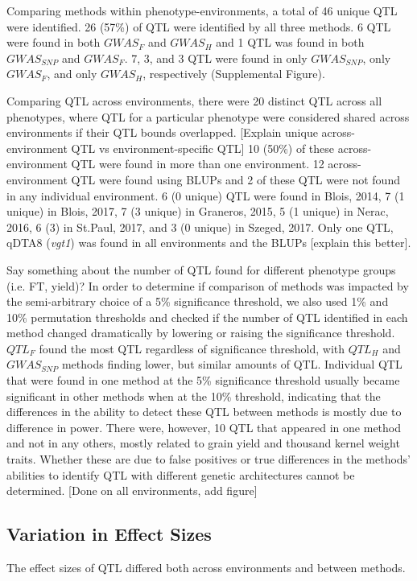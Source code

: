 \documentclass[article,9pt,twocolumn,twoside]{rilabRxiv}
\begin{document}
Comparing methods within phenotype-environments, a total of 46 unique QTL were identified.
26 (57\%) of QTL were identified by all three methods.
6 QTL were found in both $GWAS_F$ and $GWAS_H$ and 1 QTL was found in both $GWAS_{SNP}$ and $GWAS_F$.
7, 3, and 3 QTL were found in only $GWAS_{SNP}$, only $GWAS_F$, and only $GWAS_H$, respectively (Supplemental Figure).

Comparing QTL across environments, there were 20 distinct QTL across all phenotypes, where QTL for a particular phenotype were considered shared across environments if their QTL bounds overlapped.
[Explain unique across-environment QTL vs environment-specific QTL]
10 (50\%) of these across-environment QTL were found in more than one environment.
12 across-environment QTL were found using BLUPs and 2 of these QTL were not found in any individual environment.
6 (0 unique) QTL were found in Blois, 2014, 7 (1 unique) in Blois, 2017, 7 (3 unique) in Graneros, 2015, 5 (1 unique) in Nerac, 2016, 6 (3) in St.Paul, 2017, and 3 (0 unique) in Szeged, 2017.
Only one QTL, qDTA8 (\emph{vgt1}) was found in all environments and the BLUPs [explain this better].

Say something about the number of QTL found for different phenotype groups (i.e. FT, yield)?
In order to determine if comparison of methods was impacted by the semi-arbitrary choice of a 5\% significance threshold, we also used 1\% and 10\% permutation thresholds and checked if the number of QTL identified in each method changed dramatically by lowering or raising the significance threshold.
$QTL_F$ found the most QTL regardless of significance threshold, with $QTL_H$ and $GWAS_{SNP}$ methods finding lower, but similar amounts of QTL.
Individual QTL that were found in one method at the 5\% significance threshold usually became significant in other methods when at the 10\% threshold, indicating that the differences in the ability to detect these QTL between methods is mostly due to difference in power.
There were, however, 10 QTL that appeared in one method and not in any others, mostly related to grain yield and thousand kernel weight traits.
Whether these are due to false positives or true differences in the methods' abilities to identify QTL with different genetic architectures cannot be determined.
[Done on all environments, add figure]

\subsection{Variation in Effect Sizes}
The effect sizes of QTL differed both across environments and between methods.
\end{document}
